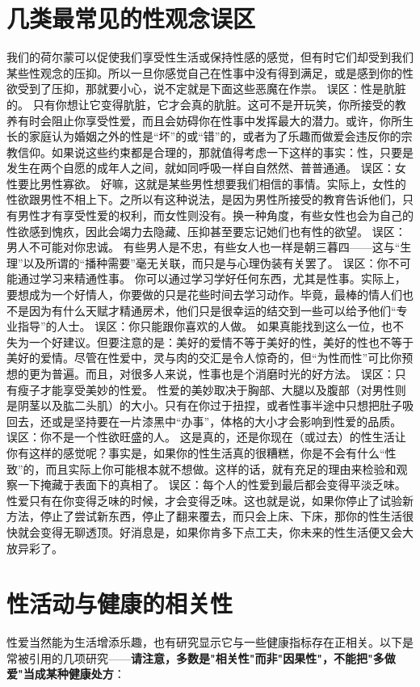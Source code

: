 \documentclass[12pt,UTF8,openany]{ctexbook}
\begin{document}
\section{几类最常见的性观念误区}
我们的荷尔蒙可以促使我们享受性生活或保持性感的感觉，但有时它们却受到我们某些性观念的压抑。所以一旦你感觉自己在性事中没有得到满足，或是感到你的性欲受到了压抑，那就要小心，说不定就是下面这些恶魔在作祟。
误区：性是肮脏的。
只有你想让它变得肮脏，它才会真的肮脏。这可不是开玩笑，你所接受的教养有时会阻止你享受性爱，而且会妨碍你在性事中发挥最大的潜力。或许，你所生长的家庭认为婚姻之外的性是“坏”的或“错”的，或者为了乐趣而做爱会违反你的宗教信仰。如果说这些约束都是合理的，那就值得考虑一下这样的事实：性，只要是发生在两个自愿的成年人之间，就如同呼吸一样自自然然、普普通通。
误区：女性要比男性寡欲。
好嘛，这就是某些男性想要我们相信的事情。实际上，女性的性欲跟男性不相上下。之所以有这种说法，是因为男性所接受的教育告诉他们，只有男性才有享受性爱的权利，而女性则没有。换一种角度，有些女性也会为自己的性欲感到愧疚，因此会竭力去隐藏、压抑甚至要忘记她们也有性的欲望。
误区：男人不可能对你忠诚。
有些男人是不忠，有些女人也一样是朝三暮四——这与“生理”以及所谓的“播种需要”毫无关联，而只是与心理伪装有关罢了。
误区：你不可能通过学习来精通性事。
你可以通过学习学好任何东西，尤其是性事。实际上，要想成为一个好情人，你要做的只是花些时间去学习动作。毕竟，最棒的情人们也不是因为有什么天赋才精通房术，他们只是很幸运的结交到一些可以给予他们“专业指导”的人士。
误区：你只能跟你喜欢的人做。
如果真能找到这么一位，也不失为一个好建议。但要注意的是：美好的爱情不等于美好的性，美好的性也不等于美好的爱情。尽管在性爱中，灵与肉的交汇是令人惊奇的，但“为性而性”可比你预想的更为普遍。而且，对很多人来说，性事也是个消磨时光的好方法。
误区：只有瘦子才能享受美妙的性爱。
性爱的美妙取决于胸部、大腿以及腹部（对男性则是阴茎以及肱二头肌）的大小。只有在你过于扭捏，或者性事半途中只想把肚子吸回去，还或是坚持要在一片漆黑中“办事”，体格的大小才会影响到性爱的品质。
误区：你不是一个性欲旺盛的人。
这是真的，还是你现在（或过去）的性生活让你有这样的感觉呢？事实是，如果你的性生活真的很糟糕，你是不会有什么“性致”的，而且实际上你可能根本就不想做。这样的话，就有充足的理由来检验和观察一下掩藏于表面下的真相了。
误区：每个人的性爱到最后都会变得平淡乏味。
性爱只有在你变得乏味的时候，才会变得乏味。这也就是说，如果你停止了试验新方法，停止了尝试新东西，停止了翻来覆去，而只会上床、下床，那你的性生活很快就会变得无聊透顶。好消息是，如果你肯多下点工夫，你未来的性生活便又会大放异彩了。
\section{性活动与健康的相关性}
性爱当然能为生活增添乐趣，也有研究显示它与一些健康指标存在正相关。以下是常被引用的几项研究——\textbf{请注意，多数是"相关性"而非"因果性"，不能把"多做爱"当成某种健康处方}：
\end{document}
